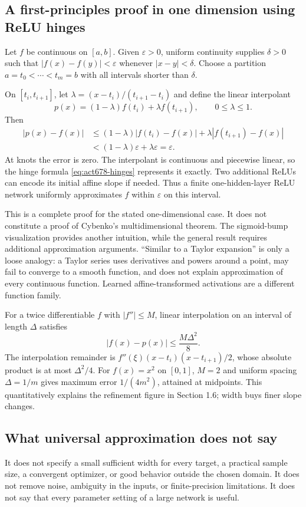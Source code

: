 \subsection{A first-principles proof in one dimension using ReLU hinges}
Let $f$ be continuous on $[a,b]$. Given $\varepsilon>0$, uniform continuity supplies $\delta>0$ such that $|f(x)-f(y)|<\varepsilon$ whenever $|x-y|<\delta$. Choose a partition
$a=t_0<\cdots<t_m=b$ with all intervals shorter than $\delta$.

On $[t_i,t_{i+1}]$, let $\lambda=(x-t_i)/(t_{i+1}-t_i)$ and define the linear interpolant
\[
 p(x)=(1-\lambda)f(t_i)+\lambda f(t_{i+1}),\qquad 0\leq\lambda\leq1.
\]
Then
\begin{align*}
 |p(x)-f(x)|
 &\leq(1-\lambda)|f(t_i)-f(x)|+\lambda|f(t_{i+1})-f(x)|\\
 &<(1-\lambda)\varepsilon+\lambda\varepsilon=\varepsilon.
\end{align*}
At knots the error is zero. The interpolant is continuous and piecewise linear, so the hinge formula \eqref{eq:act678-hinges} represents it exactly. Two additional ReLUs can encode its initial affine slope if needed. Thus a finite one-hidden-layer ReLU network uniformly approximates $f$ within $\varepsilon$ on this interval.

This is a complete proof for the stated one-dimensional case. It does not constitute a proof of Cybenko's multidimensional theorem. The sigmoid-bump visualization provides another intuition, while the general result requires additional approximation arguments. ``Similar to a Taylor expansion'' is only a loose analogy: a Taylor series uses derivatives and powers around a point, may fail to converge to a smooth function, and does not explain approximation of every continuous function. Learned affine-transformed activations are a different function family.

For a twice differentiable $f$ with $|f''|\leq M$, linear interpolation on an interval of length $\Delta$ satisfies
\[
 |f(x)-p(x)|\leq\frac{M\Delta^2}{8}.
\]
The interpolation remainder is $f''(\xi)(x-t_i)(x-t_{i+1})/2$, whose absolute product is at most $\Delta^2/4$. For $f(x)=x^2$ on $[0,1]$, $M=2$ and uniform spacing $\Delta=1/m$ gives maximum error $1/(4m^2)$, attained at midpoints. This quantitatively explains the refinement figure in Section 1.6; width buys finer slope changes.

\subsection{What universal approximation does not say}
It does not specify a small sufficient width for every target, a practical sample size, a convergent optimizer, or good behavior outside the chosen domain. It does not remove noise, ambiguity in the inputs, or finite-precision limitations. It does not say that every parameter setting of a large network is useful.

